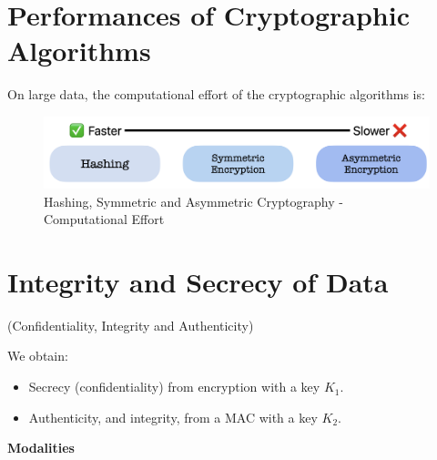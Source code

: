 \section*{Performances of Cryptographic Algorithms}
On large data, the computational effort of the cryptographic algorithms is:
\begin{figure}[H]
    \centering
    \includegraphics[width=0.7\linewidth]{Images/Cryptography/velocity.png}
    \caption{Hashing, Symmetric and Asymmetric Cryptography - Computational Effort}
\end{figure}

\clearpage 
\section{Integrity and Secrecy of Data}
\begin{center}
    (Confidentiality, Integrity and Authenticity)
\end{center}
We obtain:
\begin{itemize}
    \item Secrecy (confidentiality) from encryption with a key $K_1$.
    \item Authenticity, and integrity, from a MAC with a key $K_2$.
\end{itemize}

\hfill 

\begin{center}
    \textbf{Modalities}
\end{center}

